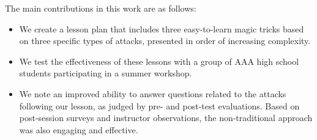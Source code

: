 The main contributions in this work are as follows:

\begin{itemize}

\item{We create a lesson plan that includes three easy-to-learn magic
  tricks based on three specific types of attacks,
    presented in order of increasing complexity.}

\item{We test the effectiveness of these lessons with
  a group of AAA high school students
  participating in a summer workshop.}

\item{We note an improved ability to answer questions related to the
  attacks following our lesson,
    as judged by pre- and post-test evaluations.  Based on post-session
    surveys and instructor observations, the non-traditional approach was
    also engaging and effective.}

\end{itemize}

